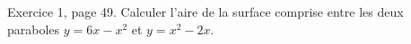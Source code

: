 \begin{exercice}\label{exoGeneral0022}

Exercice 1, page 49. Calculer l'aire de la surface comprise entre les deux paraboles $y=6x-x^2$ et $y=x^2-2x$.

\end{exercice}
